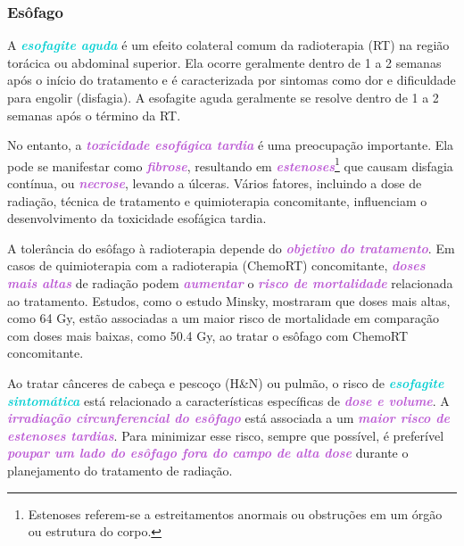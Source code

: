 \documentclass[11pt,a4paper]{article}
\begin{document}
\subsubsection*{Esôfago}

	A \textcolor{DarkTurquoise}{\textbf{\textit{esofagite aguda}}} é um efeito colateral comum da radioterapia (RT) na região torácica ou abdominal superior. Ela ocorre geralmente dentro de 1 a 2 semanas após o início do tratamento e é caracterizada por sintomas como dor e dificuldade para engolir (disfagia). A esofagite aguda geralmente se resolve dentro de 1 a 2 semanas após o término da RT.

	No entanto, a \textcolor{MediumOrchid}{\textbf{\textit{toxicidade esofágica tardia}}} é uma preocupação importante. Ela pode se manifestar como \textcolor{MediumOrchid}{\textbf{\textit{fibrose}}}, resultando em \textcolor{MediumOrchid}{\textbf{\textit{estenoses}}}\footnote{Estenoses referem-se a estreitamentos anormais ou obstruções em um órgão ou estrutura do corpo.} que causam disfagia contínua, ou \textcolor{MediumOrchid}{\textbf{\textit{necrose}}}, levando a úlceras. Vários fatores, incluindo a dose de radiação, técnica de tratamento e quimioterapia concomitante, influenciam o desenvolvimento da toxicidade esofágica tardia.

	A tolerância do esôfago à radioterapia depende do \textcolor{MediumOrchid}{\textbf{\textit{objetivo do tratamento}}}. Em casos de quimioterapia com a radioterapia (ChemoRT) concomitante, \textcolor{MediumOrchid}{\textbf{\textit{doses mais altas}}} de radiação podem \textcolor{MediumOrchid}{\textbf{\textit{aumentar}}} o \textcolor{MediumOrchid}{\textbf{\textit{risco de mortalidade}}} relacionada ao tratamento. Estudos, como o estudo Minsky, mostraram que doses mais altas, como 64 Gy, estão associadas a um maior risco de mortalidade em comparação com doses mais baixas, como 50.4 Gy, ao tratar o esôfago com ChemoRT concomitante.

	Ao tratar cânceres de cabeça e pescoço (H\&N) ou pulmão, o risco de \textcolor{DarkTurquoise}{\textbf{\textit{esofagite sintomática}}} está relacionado a características específicas de \textcolor{MediumOrchid}{\textbf{\textit{dose e volume}}}. A \textcolor{MediumOrchid}{\textbf{\textit{irradiação circunferencial do esôfago}}} está associada a um \textcolor{MediumOrchid}{\textbf{\textit{maior risco de estenoses tardias}}}. Para minimizar esse risco, sempre que possível, é preferível \textcolor{MediumOrchid}{\textbf{\textit{poupar um lado do esôfago fora do campo de alta dose}}} durante o planejamento do tratamento de radiação.
\end{document}
